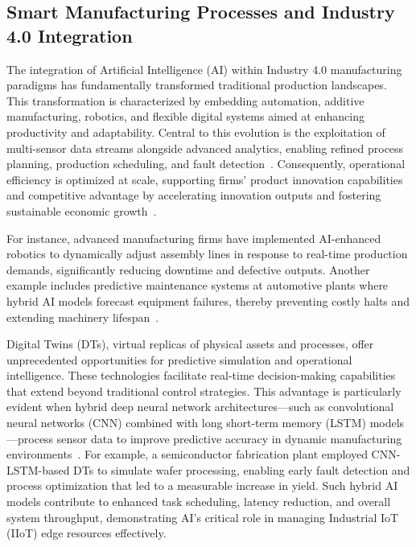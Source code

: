 \documentclass[sigconf]{acmart}
\begin{document}
\subsection{Smart Manufacturing Processes and Industry 4.0 Integration}

The integration of Artificial Intelligence (AI) within Industry 4.0 manufacturing paradigms has fundamentally transformed traditional production landscapes. This transformation is characterized by embedding automation, additive manufacturing, robotics, and flexible digital systems aimed at enhancing productivity and adaptability. Central to this evolution is the exploitation of multi-sensor data streams alongside advanced analytics, enabling refined process planning, production scheduling, and fault detection~\cite{ref6,ref7,ref33,ref35}. Consequently, operational efficiency is optimized at scale, supporting firms’ product innovation capabilities and competitive advantage by accelerating innovation outputs and fostering sustainable economic growth~\cite{ref20}. 

For instance, advanced manufacturing firms have implemented AI-enhanced robotics to dynamically adjust assembly lines in response to real-time production demands, significantly reducing downtime and defective outputs. Another example includes predictive maintenance systems at automotive plants where hybrid AI models forecast equipment failures, thereby preventing costly halts and extending machinery lifespan~\cite{ref33,ref31}.

Digital Twins (DTs), virtual replicas of physical assets and processes, offer unprecedented opportunities for predictive simulation and operational intelligence. These technologies facilitate real-time decision-making capabilities that extend beyond traditional control strategies. This advantage is particularly evident when hybrid deep neural network architectures—such as convolutional neural networks (CNN) combined with long short-term memory (LSTM) models—process sensor data to improve predictive accuracy in dynamic manufacturing environments~\cite{ref31,ref33,ref35}. For example, a semiconductor fabrication plant employed CNN-LSTM-based DTs to simulate wafer processing, enabling early fault detection and process optimization that led to a measurable increase in yield. Such hybrid AI models contribute to enhanced task scheduling, latency reduction, and overall system throughput, demonstrating AI’s critical role in managing Industrial IoT (IIoT) edge resources effectively.
\end{document}
